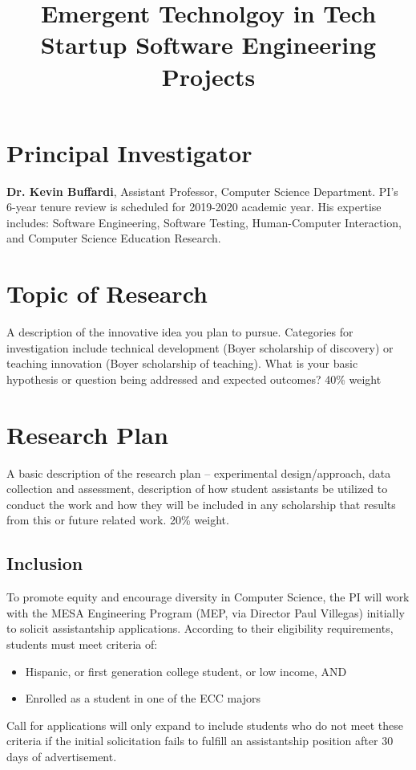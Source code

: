 \documentclass[letterpaper]{article}
\title{Emergent Technolgoy in Tech Startup Software Engineering Projects}
\author{}
\date{}
\begin{document}
  \maketitle
  \section{Principal Investigator}

    \textbf{Dr. Kevin Buffardi}, Assistant Professor, Computer Science 
    Department. PI's 6-year tenure review is scheduled for 2019-2020 academic 
    year. His expertise includes: Software Engineering, Software Testing, 
    Human-Computer Interaction, and Computer Science Education Research.

  \section{Topic of Research}
  A description of the innovative idea you plan to pursue. Categories for
  investigation include technical development (Boyer scholarship of discovery) 
  or teaching innovation (Boyer scholarship of teaching). What is your basic 
  hypothesis or question being addressed and expected outcomes? 40\% weight

  \section{Research Plan}
  A basic description of the research plan – experimental design/approach, data
  collection and assessment, description of how student assistants be utilized to conduct the work and how they will be included in any scholarship that results from this or future related work. 20\% weight.

  \subsection{Inclusion}
  To promote equity and encourage diversity in Computer Science, the PI will work with the MESA Engineering Program (MEP, via Director Paul Villegas) initially to solicit assistantship applications. According to their eligibility requirements, students must meet criteria of:
  \begin{itemize}
    \item Hispanic, or first generation college student, or low income, AND
    \item Enrolled as a student in one of the ECC majors
  \end{itemize}
  Call for applications will only expand to include students who do not meet these criteria if the initial solicitation fails to fulfill an assistantship position after 30 days of advertisement.
\end{document}
